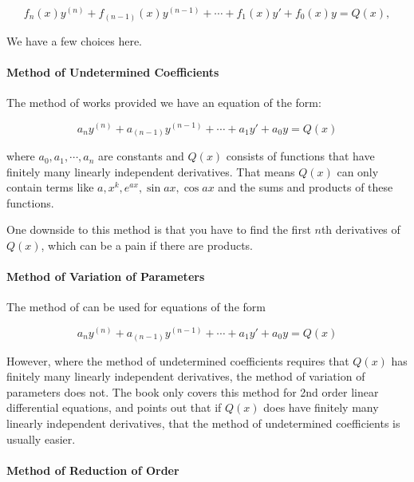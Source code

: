 \documentclass{article}
\begin{document}
\[ f_n(x)y^{(n)} + f_{(n-1)}(x)y^{(n-1)} + \cdots + f_1(x)y' + f_0(x)y = Q(x), \]

We have a few choices here.

\paragraph{Method of Undetermined Coefficients}

The method of  works provided we have an equation of the form:

\[ a_ny^{(n)} + a_{(n-1)}y^{(n-1)} + \cdots + a_1y' + a_0y = Q(x) \]

where $a_0, a_1, \cdots, a_n$ are constants and $Q(x)$ consists of functions that have finitely many linearly independent derivatives. That means $Q(x)$ can only contain terms like $a, x^k, e^{ax}, \sin{ax}, \cos{ax}$ and the sums and products of these functions.

One downside to this method is that you have to find the first $n$th derivatives of $Q(x)$, which can be a pain if there are products.

\paragraph{Method of Variation of Parameters}

The method of  can be used for equations of the form

\[ a_ny^{(n)} + a_{(n-1)}y^{(n-1)} + \cdots + a_1y' + a_0y = Q(x) \]

However, where the method of undetermined coefficients requires that $Q(x)$ has finitely many linearly independent derivatives, the method of variation of parameters does not. The book only covers this method for 2nd order linear differential equations, and points out that if $Q(x)$ does have finitely many linearly independent derivatives, that the method of undetermined coefficients is usually easier.

\paragraph{Method of Reduction of Order}
\end{document}
